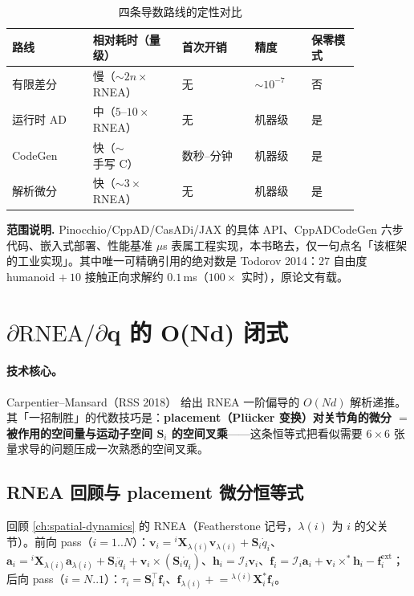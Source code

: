 \begin{table}[H]\centering\small
\caption{四条导数路线的定性对比}
\label{tab:cd-deriv}
\begin{tabular}{p{0.20\linewidth}p{0.22\linewidth}p{0.18\linewidth}p{0.14\linewidth}p{0.12\linewidth}}
\toprule
路线 & 相对耗时（量级） & 首次开销 & 精度 & 保零模式 \\
\midrule
有限差分 & 慢（$\sim2n\times$ RNEA） & 无 & $\sim10^{-7}$ & 否 \\
运行时 AD & 中（$5$–$10\times$ RNEA） & 无 & 机器级 & 是 \\
CodeGen & 快（$\sim$ 手写 C） & 数秒–分钟 & 机器级 & 是 \\
解析微分 & 快（$\sim3\times$ RNEA） & 无 & 机器级 & 是 \\
\bottomrule
\end{tabular}
\end{table}

\begin{note}
\textbf{范围说明.}\;
Pinocchio/CppAD/CasADi/JAX 的具体 API、CppADCodeGen 六步代码、嵌入式部署、性能基准 $\mu$s 表属工程实现，本书略去，仅一句点名「该框架的工业实现」。其中唯一可精确引用的绝对数是 Todorov 2014\cite{todorov2014convex}：$27$ 自由度 humanoid $+\ 10$ 接触正向求解约 $0.1$\,ms（$100\times$ 实时），原论文有载。
\end{note}

\section{\texorpdfstring{$\partial\mathrm{RNEA}/\partial\mathbf q$}{dRNEA/dq} 的 O(Nd) 闭式}
\label{sec:cd-drnea}

\paragraph{技术核心。}
Carpentier--Mansard（RSS 2018）\cite{carpentier2018analytical} 给出 RNEA 一阶偏导的 $O(Nd)$ 解析递推。其「一招制胜」的代数技巧是：\textbf{placement（Plücker 变换）对关节角的微分 $=$ 被作用的空间量与运动子空间 $\mathbf S_i$ 的空间叉乘}——这条恒等式把看似需要 $6\times6$ 张量求导的问题压成一次熟悉的空间叉乘。

\subsection{RNEA 回顾与 placement 微分恒等式}
回顾 \cref{ch:spatial-dynamics} 的 RNEA（Featherstone 记号，$\lambda(i)$ 为 $i$ 的父关节）。前向 pass（$i=1..N$）：$\mathbf v_i={}^i\mathbf X_{\lambda(i)}\mathbf v_{\lambda(i)}+\mathbf S_i\dot q_i$、$\mathbf a_i={}^i\mathbf X_{\lambda(i)}\mathbf a_{\lambda(i)}+\mathbf S_i\ddot q_i+\mathbf v_i\times(\mathbf S_i\dot q_i)$、$\mathbf h_i=\mathcal I_i\mathbf v_i$、$\mathbf f_i=\mathcal I_i\mathbf a_i+\mathbf v_i\times^*\mathbf h_i-\mathbf f_i^{\text{ext}}$；后向 pass（$i=N..1$）：$\tau_i=\mathbf S_i^\top\mathbf f_i$、$\mathbf f_{\lambda(i)}\mathrel{+}={}^{\lambda(i)}\mathbf X_i^*\mathbf f_i$。

